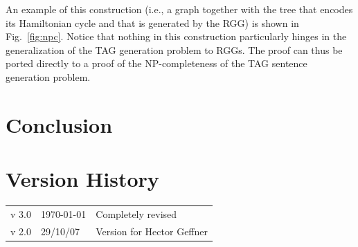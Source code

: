 \documentclass[11pt,a4]{article}
\theoremstyle{plain}
\theoremstyle{definition}
\begin{document}
An example of this construction (i.e., a graph together with the tree
that encodes its Hamiltonian cycle and that is generated by the RGG)
is shown in Fig.~\ref{fig:npc}. Notice that nothing in this
construction particularly hinges in the generalization of the TAG
generation problem to RGGs. The proof can thus be ported directly to a
proof of the NP-completeness of the TAG sentence generation problem.



\section{Conclusion}




\section*{Version History}

\begin{tabular}{lll}
  v 3.0 & \today & Completely revised \\
  v 2.0 & 29/10/07 & Version for Hector Geffner
\end{tabular}





\end{document}
